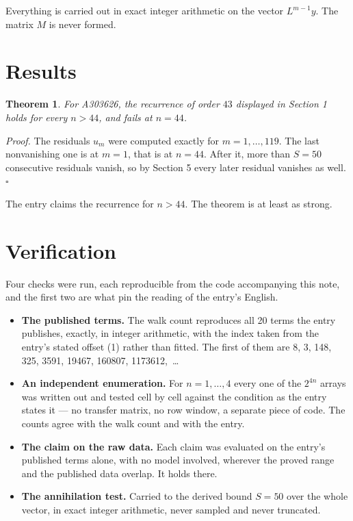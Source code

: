 \documentclass[11pt]{article}
\newtheorem{theorem}{Theorem}
\theoremstyle{definition}
\begin{document}
Everything is carried out in exact integer arithmetic on the vector $L^{m-1}y$. The matrix $M$ is never formed.

\section{Results}

\begin{theorem} For A303626, the recurrence of order $43$ displayed in Section 1 holds for every $n > 44$, and fails at $n = 44$.\end{theorem}

{\itshape Proof.} The residuals $u_m$ were computed exactly for $m = 1,\dots,119$. The last nonvanishing one is at $m = 1$, that is at $n = 44$. After it, more than $S = 50$ consecutive residuals vanish, so by Section 5 every later residual vanishes as well. $\square$

The entry claims the recurrence for $n > 44$. The theorem is at least as strong.

\section{Verification}

Four checks were run, each reproducible from the code accompanying this note, and the first two are what pin the reading of the entry's English.

\begin{itemize}

\item {\bfseries The published terms.} The walk count reproduces all 20 terms the entry publishes, exactly, in integer arithmetic, with the index taken from the entry's stated offset (1) rather than fitted. The first of them are 8, 3, 148, 325, 3591, 19467, 160807, 1173612,~\dots

\item {\bfseries An independent enumeration.} For $n = 1,\dots,4$ every one of the $2^{4n}$ arrays was written out and tested cell by cell against the condition as the entry states it --- no transfer matrix, no row window, a separate piece of code. The counts agree with the walk count and with the entry.

\item {\bfseries The claim on the raw data.} Each claim was evaluated on the entry's published terms alone, with no model involved, wherever the proved range and the published data overlap. It holds there.

\item {\bfseries The annihilation test.} Carried to the derived bound $S = 50$ over the whole vector, in exact integer arithmetic, never sampled and never truncated.

\end{itemize}
\end{document}
